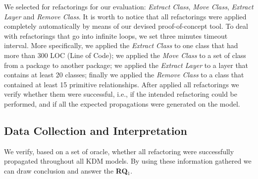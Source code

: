 We selected for refactorings for our evaluation: \textit{Extract Class}, \textit{Move Class}, \textit{Extract Layer} and \textit{Remove Class}. %
It is worth to notice that all refactorings were applied completely automatically by means of our devised proof-of-concept tool. To deal with refactorings that go into infinite loops, we set three minutes timeout interval. More specifically, we applied the \textit{Extract Class} to one class that had more than 300 LOC (Line of Code); we applied the \textit{Move Class} to a set of  class from a package to another package; we applied the \textit{Extract Layer} to a layer that contains at least 20 classes; finally we applied the \textit{Remove Class} to a class that contained at least 15 primitive relationships. After applied all refactorings we verify whether them were successful, i.e., if the intended refactoring could be performed, and if all the expected propagations were generated on the model. 

\subsection{Data Collection and Interpretation}

We verify, based on a set of oracle, whether all refactoring were successfully propagated throughout all KDM models. By using these information gathered we can draw conclusion and answer the \textbf{RQ$_1$}.

